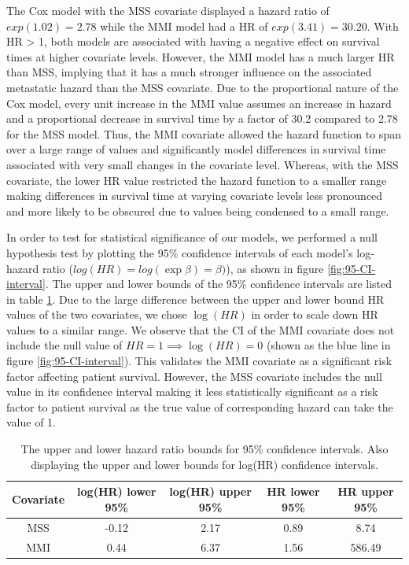 \documentclass{l4proj}
\begin{document}
The Cox model with the MSS covariate displayed a hazard ratio of \(exp(1.02) = 2.78\) while the MMI model had a HR of \(exp(3.41) = 30.20\). With HR > 1, both models are associated with having a negative effect on survival times at higher covariate levels. However, the MMI model has a much larger HR than MSS, implying that it has a much stronger influence on the associated metastatic hazard than the MSS covariate. Due to the proportional nature of the Cox model, every unit increase in the MMI value assumes an increase in hazard and a proportional decrease in survival time by a factor of 30.2 compared to 2.78 for the MSS model. Thus, the MMI covariate allowed the hazard function to span over a large range of values and significantly model differences in survival time associated with very small changes in the covariate level. Whereas, with the MSS covariate, the lower HR value restricted the hazard function to a smaller range making differences in survival time at varying covariate levels less pronounced and more likely to be obscured due to values being condensed to a small range.  

In order to test for statistical significance of our models, we performed a null hypothesis test by plotting the 95\% confidence intervals of each model's log-hazard ratio (\(log(HR) = log(\exp{\beta}) = \beta)\)), as shown in figure \ref{fig:95-CI-interval}. The upper and lower bounds of the 95\% confidence intervals are listed in table \ref{tab:CI-stats}. Due to the large difference between the upper and lower bound HR values of the two covariates, we chose \(\log(HR)\) in order to scale down HR values  to a similar range. We observe that the CI of the MMI covariate does not include the null value of \(HR = 1 \implies \log(HR) = 0\) (shown as the blue line in figure \ref{fig:95-CI-interval}). This validates the MMI covariate as a significant risk factor affecting patient survival. However, the MSS covariate includes the null value in its confidence interval making it less statistically significant as a risk factor to patient survival as the true value of corresponding hazard can take the value of 1. 

\begin{table}[h]
    \centering
    \begin{tabular}{c|c|c|c|c}
    \hline 
         Covariate&log(HR) lower 95\%&log(HR) upper 95\%&HR lower 95\%&HR upper 95\%\\ \hline
         MSS & -0.12 & 2.17 & 0.89 & 8.74  \\
         MMI& 0.44 & 6.37 & 1.56 & 586.49 
    \end{tabular}
    \caption{The upper and lower hazard ratio bounds for 95\% confidence intervals. Also displaying the upper and lower bounds for log(HR) confidence intervals. }
    \label{tab:CI-stats}
\end{table}
\end{document}
